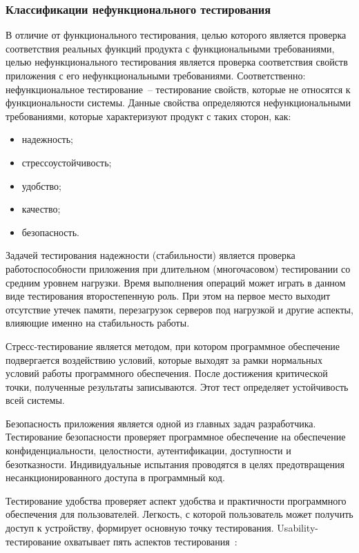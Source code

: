 \subsubsection{Классификации нефункционального тестирования}

В отличие от функционального тестирования, целью которого является 
проверка соответствия реальных функций продукта с функциональными 
требованиями, целью нефункционального тестирования является проверка 
соответствия свойств приложения с его нефункциональными требованиями.
Соответственно: нефункциональное тестирование~-- тестирование 
свойств, которые не относятся к функциональности системы. Данные свойства 
определяются нефункциональными требованиями, которые характеризуют 
продукт с таких сторон, как:

\begin{itemize}
    \item надежность;
    \item стрессоустойчивость;
    \item удобство;
    \item качество;
    \item безопасность.
\end{itemize}

Задачей тестирования надежности (стабильности) является проверка 
работоспособности приложения при длительном (многочасовом) 
тестировании со средним уровнем нагрузки. Время выполнения операций 
может играть в данном виде тестирования второстепенную роль. При этом на 
первое место выходит отсутствие утечек памяти, перезагрузок серверов под 
нагрузкой и другие аспекты, влияющие именно на стабильность работы.

Стресс-тестирование является методом, при котором программное 
обеспечение подвергается воздействию условий, которые выходят за рамки 
нормальных условий работы программного обеспечения. После достижения 
критической точки, полученные результаты записываются. Этот тест 
определяет устойчивость всей системы.

Безопасность приложения является одной из главных задач 
разработчика. Тестирование безопасности проверяет программное 
обеспечение на обеспечение конфиденциальности, целостности, 
аутентификации, доступности и безотказности. Индивидуальные испытания 
проводятся в целях предотвращения несанкционированного доступа в 
программный код.

Тестирование удобства проверяет аспект удобства и практичности 
программного обеспечения для пользователей. Легкость, с которой 
пользователь может получить доступ к устройству, формирует основную 
точку тестирования. Usability-тестирование охватывает пять аспектов 
тестирования~\cite{testing_epam}:

